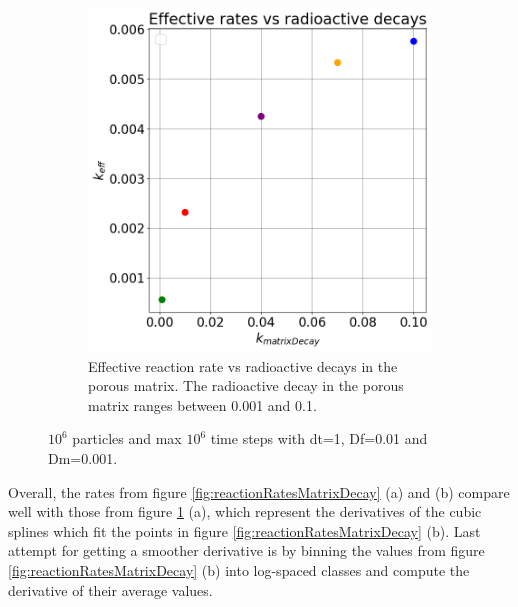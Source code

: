\documentclass{article}
\begin{document}
\begin{figure}[htbp]
\begin{subfigure}[b]{0.48\textwidth}
        \includegraphics[width=\textwidth]{images/effVsDecayRates.png}
        \caption{Effective reaction rate vs radioactive decays in the porous matrix. The radioactive decay in the porous matrix ranges between 0.001 and 0.1.}
    \end{subfigure}
    \caption{$10^6$ particles and max $10^6$ time steps with dt=1, Df=0.01 and Dm=0.001.}
    \label{fig:effVsRadioactivedecays}
\end{figure}
Overall, the rates from figure \ref{fig:reactionRatesMatrixDecay} (a) and (b) compare well with those from figure \ref{fig:effVsRadioactivedecays} (a), which represent the derivatives of the cubic splines which fit the points in figure \ref{fig:reactionRatesMatrixDecay} (b). Last attempt for getting a smoother derivative is by binning the values from figure \ref{fig:reactionRatesMatrixDecay} (b) into log-spaced classes and compute the derivative of their average values.
\end{document}
